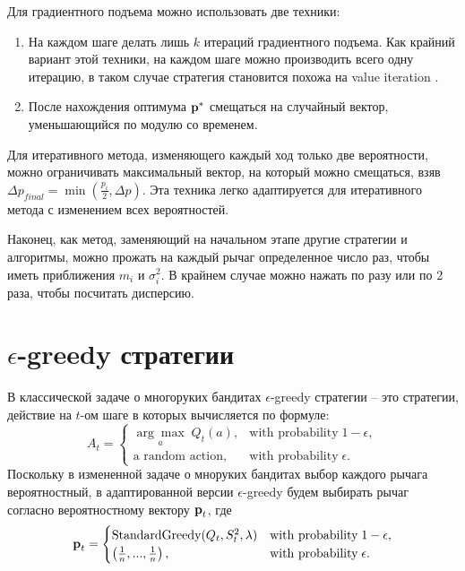 Для градиентного подъема можно использовать две техники:
\begin{enumerate}
    \item На каждом шаге делать лишь $k$ итераций градиентного подъема. Как крайний вариант этой техники, на каждом шаге можно производить всего одну итерацию, в таком случае стратегия становится похожа на value iteration \cite{suttonbarto_value_iteration}.
    \item После нахождения оптимума $\textbf{p}^*$ смещаться на случайный вектор, уменьшающийся по модулю со временем.
\end{enumerate}

Для итеративного метода, изменяющего каждый ход только две вероятности, можно ограничивать максимальный вектор, на который можно смещаться, взяв $\Delta p_{final} = \min (\frac{p_i}{2}, \Delta p)$. Эта техника легко адаптируется для итеративного метода с изменением всех вероятностей.

Наконец, как метод, заменяющий на начальном этапе другие стратегии и алгоритмы, можно прожать на каждый рычаг определенное число раз, чтобы иметь приближения $m_i$ и $\sigma_i^2$. В крайнем случае можно нажать по разу или по 2 раза, чтобы посчитать дисперсию.

\section{$\epsilon$-greedy стратегии}

В классической задаче о многоруких бандитах $\epsilon$-greedy стратегии -- это стратегии, действие на $t$-ом шаге в которых вычисляется по формуле:
\[
A_t = \begin{cases}
           \underset{a}{\arg \max} \; Q_t(a), & \text{with probability} \; 1 - \epsilon, \\
           \text{a random action}, & \text{with probability} \; \epsilon.
       \end{cases}
\]
Поскольку в измененной задаче о мноруких бандитах выбор каждого рычага вероятностный, в адаптированной версии $\epsilon$-greedy будем выбирать рычаг согласно вероятностному вектору $\textbf{p}_t$, где
\[
\textbf{p}_t = 
    \begin{cases}
           \text{StandardGreedy}(Q_t, S_t^2, \lambda) & \text{with probability} \; 1 - \epsilon, \\
           \left( \frac{1}{n}, ..., \frac{1}{n} \right), & \text{with probability} \; \epsilon.
    \end{cases}
\]

